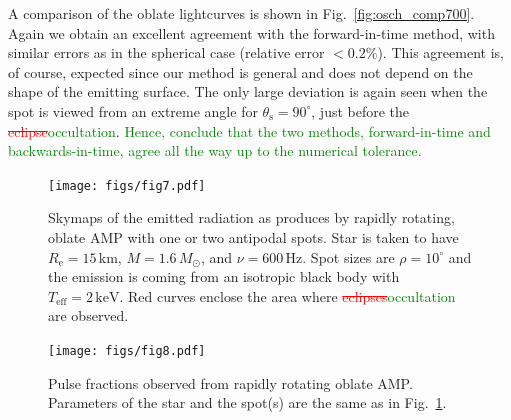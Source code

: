 \documentclass{aa}
\newcommand{\refe}[1]{\textcolor{green}{{#1}}}
\newcommand{\refedel}[1]{\textcolor{red}{\sout{#1}}}
\newcommand{\Msun}{\ensuremath{M_{\odot}}}
\begin{document}
A comparison of the oblate lightcurves is shown in Fig.~\ref{fig:osch_comp700}.
Again we obtain an excellent agreement with the forward-in-time method, with similar errors as in the spherical case (relative error $< 0.2\%$).
This agreement is, of course, expected since our method is general and does not depend on the shape of the emitting surface.
The only large deviation is again seen when the spot is viewed from an extreme angle for $\theta_{\mathrm{s}} = 90^{\circ}$, just before the \refedel{eclipse}\refe{occultation}.
\refe{Hence, conclude that the two methods, forward-in-time and backwards-in-time, agree all the way up to the numerical tolerance.}



\begin{figure}
\texttt{[image: figs/fig7.pdf]}
\caption{\label{fig:skymap}
    Skymaps of the emitted radiation as produces by rapidly rotating, oblate AMP with one or two antipodal spots.
    Star is taken to have $R_{\mathrm{e}} = 15\,\mathrm{km}$, $M=1.6\,\Msun$, and $\nu = 600\,\mathrm{Hz}$.
    Spot sizes are $\rho = 10^{\circ}$ and the emission is coming from an isotropic black body with $T_{\mathrm{eff}} = 2\,\mathrm{keV}$.
    Red curves enclose the area where \refedel{eclipses}\refe{occultation} are observed.
  }
\end{figure}

\begin{figure}
\texttt{[image: figs/fig8.pdf]}
\caption{\label{fig:pulsefracs}
    Pulse fractions observed from rapidly rotating oblate AMP.
    Parameters of the star and the spot(s) are the same as in Fig.~\ref{fig:skymap}.
  }
\end{figure}
\end{document}
